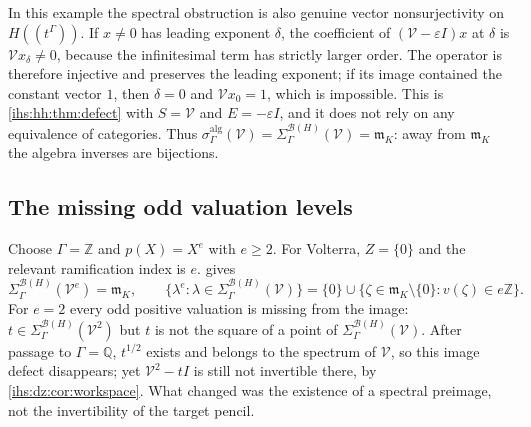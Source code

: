 \documentclass[11pt,a4paper]{article}
\numberwithin{equation}{section}
\theoremstyle{definition}
\theoremstyle{remark}
\newcommand{\Q}{\mathbb Q}
\newcommand{\Z}{\mathbb Z}
\newcommand{\mK}{\mathfrak m_K}
\newcommand{\B}{\mathcal B(H)}
\newcommand{\eps}{\varepsilon}
\begin{document}
In this example the spectral obstruction is also genuine vector
nonsurjectivity on $H((t^\Gamma))$. If $x\ne0$ has leading exponent $\delta$,
the coefficient of $(\mathcal V-\eps I)x$ at $\delta$ is $\mathcal Vx_\delta\ne0$,
because the infinitesimal term has strictly larger order. The operator is
therefore injective and preserves the leading exponent; if its image
contained the constant vector $1$, then $\delta=0$ and $\mathcal Vx_0=1$,
which is impossible. This is \cref{ihs:hh:thm:defect} with $S=\mathcal V$ and
$E=-\eps I$, and it does not rely on any equivalence of categories. Thus
$\sigma^{\mathrm{alg}}_\Gamma(\mathcal V)=\Sigma^{\B}_\Gamma(\mathcal V)=\mK$:
away from $\mK$ the algebra inverses are bijections.

\subsection{The missing odd valuation levels}\label{ihs:dz:sec:odd}
Choose $\Gamma=\Z$ and $p(X)=X^e$ with $e\ge2$. For Volterra, $Z=\{0\}$ and
the relevant ramification index is $e$.  gives
\begin{equation}\label{ihs:dz:eq:volterrapower}
 \Sigma^{\B}_\Gamma(\mathcal V^e)=\mK,\qquad
 \{\lambda^e:\lambda\in\Sigma^{\B}_\Gamma(\mathcal V)\}
 =\{0\}\cup\{\zeta\in\mK\setminus\{0\}:v(\zeta)\in e\Z\}.
\end{equation}
For $e=2$ every odd positive valuation is missing from the image:
$t\in\Sigma^{\B}_\Gamma(\mathcal V^2)$ but $t$ is not the square of a point
of $\Sigma^{\B}_\Gamma(\mathcal V)$. After passage to $\Gamma=\Q$, $t^{1/2}$
exists and belongs to the spectrum of $\mathcal V$, so this image defect
disappears; yet $\mathcal V^2-tI$ is still not invertible there, by
\cref{ihs:dz:cor:workspace}. What changed was the existence of a spectral
preimage, not the invertibility of the target pencil.
\end{document}
